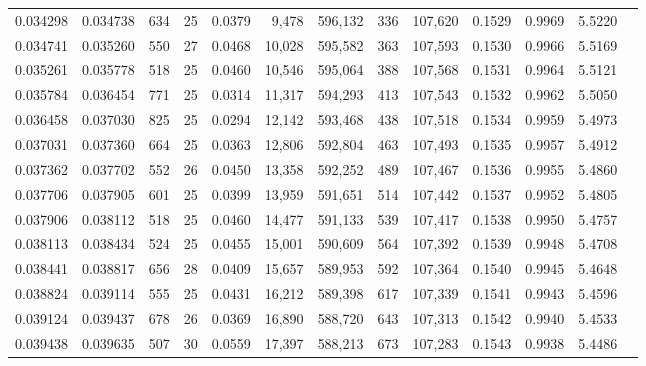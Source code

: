 \begin{tabular}{rrrrrrrrrrrrr}
0.034298 & 0.034738 & 634 &  25 &                                     0.0379 &   9,478 & 596,132 &     336 & 107,620 & 0.1529 & 0.9969 & 5.5220 \\
0.034741 & 0.035260 & 550 &  27 &                                     0.0468 &  10,028 & 595,582 &     363 & 107,593 & 0.1530 & 0.9966 & 5.5169 \\
0.035261 & 0.035778 & 518 &  25 &                                     0.0460 &  10,546 & 595,064 &     388 & 107,568 & 0.1531 & 0.9964 & 5.5121 \\
0.035784 & 0.036454 & 771 &  25 &                                     0.0314 &  11,317 & 594,293 &     413 & 107,543 & 0.1532 & 0.9962 & 5.5050 \\
0.036458 & 0.037030 & 825 &  25 &                                     0.0294 &  12,142 & 593,468 &     438 & 107,518 & 0.1534 & 0.9959 & 5.4973 \\
0.037031 & 0.037360 & 664 &  25 &                                     0.0363 &  12,806 & 592,804 &     463 & 107,493 & 0.1535 & 0.9957 & 5.4912 \\
0.037362 & 0.037702 & 552 &  26 &                                     0.0450 &  13,358 & 592,252 &     489 & 107,467 & 0.1536 & 0.9955 & 5.4860 \\
0.037706 & 0.037905 & 601 &  25 &                                     0.0399 &  13,959 & 591,651 &     514 & 107,442 & 0.1537 & 0.9952 & 5.4805 \\
0.037906 & 0.038112 & 518 &  25 &                                     0.0460 &  14,477 & 591,133 &     539 & 107,417 & 0.1538 & 0.9950 & 5.4757 \\
0.038113 & 0.038434 & 524 &  25 &                                     0.0455 &  15,001 & 590,609 &     564 & 107,392 & 0.1539 & 0.9948 & 5.4708 \\
0.038441 & 0.038817 & 656 &  28 &                                     0.0409 &  15,657 & 589,953 &     592 & 107,364 & 0.1540 & 0.9945 & 5.4648 \\
0.038824 & 0.039114 & 555 &  25 &                                     0.0431 &  16,212 & 589,398 &     617 & 107,339 & 0.1541 & 0.9943 & 5.4596 \\
0.039124 & 0.039437 & 678 &  26 &                                     0.0369 &  16,890 & 588,720 &     643 & 107,313 & 0.1542 & 0.9940 & 5.4533 \\
0.039438 & 0.039635 & 507 &  30 &                                     0.0559 &  17,397 & 588,213 &     673 & 107,283 & 0.1543 & 0.9938 & 5.4486 \\

\end{tabular}
